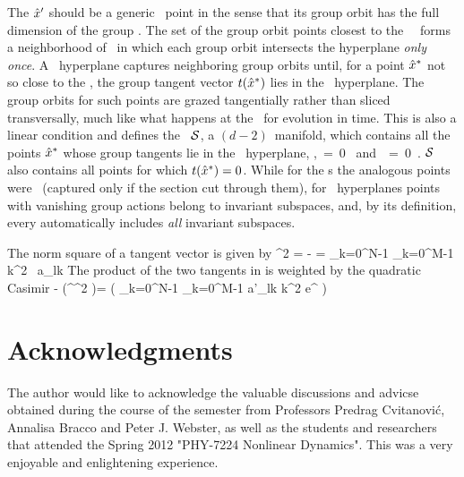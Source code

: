     \ifboyscout
The {\template} ${\hat{x}'}$ should be a generic \statesp\ point in the
sense that its group orbit has the full dimension of the group
\Group. The set of the group orbit points {closest} to the
\template\ \slicep\ forms a neighborhood of \slicep\ in which each group
orbit intersects the hyperplane \emph{only once}. A \slice\ hyperplane
captures neighboring group orbits until, for a point $\hat{x}^\ast$ not so
close to the \template, the group tangent vector $t(\hat{x}^\ast)$ lies in
the \slice\ hyperplane. The group orbits for such points are grazed
tangentially rather than sliced transversally, much like what happens at
the \poincBord\ for evolution in time.
This is also a linear condition and defines the \chartBord\ ${\cal
S}$, a $(d\!-\!2)$\dmn\ manifold, which contains
all the points $\hat{x}^\ast$ whose group tangents lie in the \slice\
hyperplane, \ie,
\beq
\braket{\sspRSing}{\sliceTan{}} \,=\, 0
      \mbox{ and }
\braket{\groupTan(\sspRSing)}{\sliceTan{}} \,=\, 0
\,.
\label{sliceSingl0}
\eeq
${\cal S}$ also contains all points for which $t(\hat{x}^\ast)=0$.
While for the \PoincSec s the analogous points were \eqva\ (captured only
if the section cut through them), for \slice\ hyperplanes points with
vanishing group actions belong to invariant subspaces, and, by its
definition, every {\chartBord} automatically includes \emph{all}
invariant subspaces.

The norm square of a tangent vector is given by
\beq
\Norm{\groupTan(\ssp)}^2
    = - \braket{\groupTan(\ssp)}{\groupTan(\ssp)}
    =  \sum_{k=0}^{N-1} \sum_{k=0}^{M-1}
       k^2 \,  a_{lk}
The product of the two tangents in  is weighted by the
\SOn{2} quadratic Casimir
\beq
    - \Re(\sspRed^\dagger \Lg^2 \slicep)=
    \Re\left( \sum_{k=0}^{N-1} \sum_{k=0}^{M-1}
    \overline{a_{lk}} a'_{lk} k^2 e^{\frac{-2 \pi i k}{N} \gSpace}
        \right)
\,

    \fi %

\section{Acknowledgments}
The author would like to acknowledge the valuable discussions and advicse
obtained during the course of the semester from Professors Predrag
Cvitanovi{\'c}, Annalisa Bracco and Peter J. Webster, as well as the
students and researchers that attended the Spring 2012  "PHY-7224
Nonlinear Dynamics". This was a very enjoyable and enlightening
experience.


